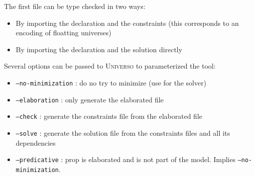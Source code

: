 \documentclass[conference]{IEEEtran}
\newcommand{\universo}{\textsc{Universo}}
\begin{document}
The first file can be type checked in two ways:
\begin{itemize}
\item By importing the declaration and the constraints (this corresponds to an encoding of floatting universes)
\item By importing the declaration and the solution directly
\end{itemize}

Several options can be passed to \universo{} to parameterized the tool:
\begin{itemize}
\item \texttt{--no-minimization} : do no try to minimize (use for the solver)
\item \texttt{--elaboration} : only generate the elaborated file
\item \texttt{--check} : generate the constraints file from the elaborated file
\item \texttt{--solve} : generate the solution file from the constraints files and all its dependencies
\item \texttt{--predicative} : prop is elaborated and is not part of the model. Implies \texttt{--no-minimization}.
\end{itemize}
\end{document}
